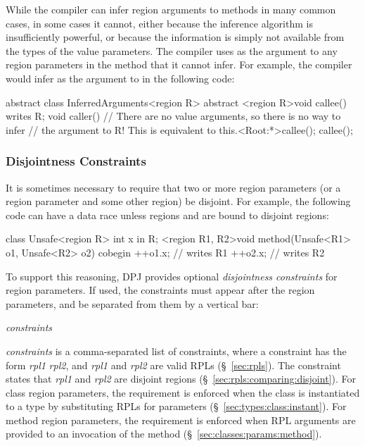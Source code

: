 While the compiler can infer region arguments to methods in many
common cases, in some cases it cannot, either because the inference
algorithm is insufficiently powerful, or because the information is
simply not available from the types of the value parameters.  The
compiler uses  as the argument to any region parameters in
the method that it cannot infer.  For example, the compiler would
infer  as the argument to  in the following code:
%
\begin{dpjlisting}
abstract class InferredArguments<region R> {
    abstract <region R>void callee() writes R;
    void caller() {
        // There are no value arguments, so there is no way to infer
        // the argument to R!  This is equivalent to this.<Root:*>callee();
        callee();
    }
}
\end{dpjlisting}


\subsubsection{Disjointness Constraints%
\label{sec:classes:params:disjoint}}

It is sometimes necessary to require that two or more region
parameters (or a region parameter and some other region) be disjoint.
For example, the following code can have a data race unless regions
 and  are bound to disjoint regions:
%
\begin{dpjlisting}
class Unsafe<region R> {
    int x in R;
    <region R1, R2>void method(Unsafe<R1> o1, Unsafe<R2> o2) {
        cobegin {
            ++o1.x; // writes R1
            ++o2.x; // writes R2
        }
    }
}
\end{dpjlisting}
%
To support this reasoning, DPJ provides optional \emph{disjointness
  constraints} for region parameters.  If used, the constraints must
appear after the region parameters, and be separated from them by a
vertical bar:
%
\begin{description}
\item {} \emph{constraints} \kwd{>}
\end{description}
%
\emph{constraints} is a comma-separated list of constraints, where a
constraint has the form \emph{rpl1} \kwd{\#} \emph{rpl2}, and
\emph{rpl1} and \emph{rpl2} are valid RPLs (\S~\ref{sec:rpls}).  The
constraint states that \emph{rpl1} and \emph{rpl2} are disjoint
regions (\S~\ref{sec:rpls:comparing:disjoint}).  For class region
parameters, the requirement is enforced when the class is instantiated
to a type by substituting RPLs for parameters
(\S~\ref{sec:types:class:instant}).  For method region parameters, the
requirement is enforced when RPL arguments are provided to an
invocation of the method (\S~\ref{sec:classes:params:method}).

